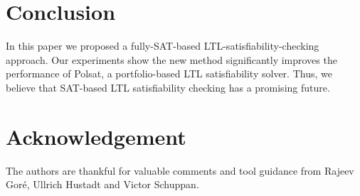 \documentclass[conference]{IEEEtran}
\begin{document}
 

\section{Conclusion}\label{sec:con}

In this paper we proposed a fully-SAT-based LTL-satisfiability-checking approach. Our experiments show the new method significantly improves
the performance of Polsat, a portfolio-based LTL satisfiability solver. Thus, we believe that SAT-based LTL satisfiability checking has a promising future.

\section{Acknowledgement}
The authors are thankful for valuable comments and tool guidance from Rajeev Gor\'e, Ullrich Hustadt and Victor Schuppan. 



\end{document}
